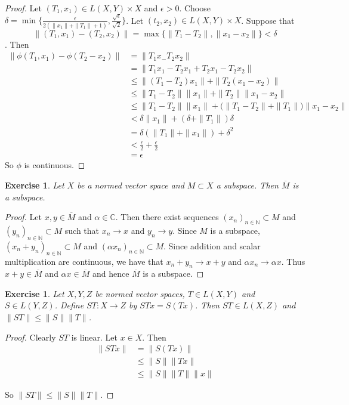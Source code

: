 \documentclass[12pt]{amsart}
\newtheorem{ex}[thm]{Exercise}
\newcommand{\al}{\alpha}
\newcommand{\del}{\delta}
\newcommand{\ep}{\epsilon}
\newcommand{\C}{\mathbb{C}}
\newcommand{\N}{\mathbb{N}}
\newcommand{\conv}[1]{\xrightarrow{#1}}
\begin{document}
	\begin{proof}
		Let $(T_1, x_1) \in L(X,Y) \times X$ and $\ep > 0$. Choose $\del = \min \{\frac{\ep}{2(\|x_1 \|+ \|T_1 \|+1)}, \frac{\sqrt{\ep}}{\sqrt{2}} \}$. Let $(t_2, x_2) \in L(X,Y) \times X$. Suppose that $$\|(T_1, x_1) - (T_2, x_2) \|= \max \{\|T_1 - T_2\|, \|x_1 -x_2 \|\} < \del$$. Then 
		\begin{align*}
			\|\phi(T_1, x_1) - \phi(T_2-x_2) \|
			&= \|T_1 x_ - T_2 x_2 \|\\
			&= \|T_1 x_1 - T_2 x_1 + T_2 x_1 - T_2 x_2 \|\\
			& \leq \|(T_1 - T_2) x_1 \|+ \|T_2(x_1 -x_2) \|\\
			& \leq \|T_1 -T_2 \|\|x_1 \|+ \|T_2 \|\|x_1 -x_2 \|\\
			& \leq \|T_1 -T_2 \|\|x_1 \|+ \big(\|T_1 - T_2 \|+ \|T_1 \|\big)\|x_1 -x_2 \|\\
			& < \del \|x_1 \|+ (\del + \|T_1 \|) \del \\
			&= \del (\|T_1 \|+ \|x_1 \|) + \del^2\\
			& < \frac{\ep}{2} + \frac{\ep}{2}\\
			&= \ep
		\end{align*}
		So $\phi$ is continuous.
	\end{proof}
	
	\begin{ex}
		Let $X$ be a normed vector space and $M \subset X$ a subspace. Then $\overline{M}$ is a subspace.
	\end{ex}
	
	\begin{proof}
		Let $x,y \in \overline{M}$ and $\al \in \C$. Then there exist sequences $(x_n)_{n \in \N} \subset M$ and $(y_n)_{n \in \N} \subset M$ such that $x_n \conv{} x$ and $y_n \conv{} y$. Since $M$ is a subspace, $(x_n +y_n)_{n \in \N} \subset M$ and $(\al x_n)_{n \in \N} \subset M$. Since addition and scalar multiplication are continuous, we have that $x_n + y_n \conv{} x+y$ and $\al x_n \conv{} \al x$. Thus $x+y \in \overline{M}$ and $\al x \in \overline{M}$ and hence $\overline{M}$ is a subspace.
	\end{proof}
	
	\begin{ex}
		Let $X,Y,Z$ be normed vector spaces, $T \in L(X,Y)$ and $S \in L(Y,Z)$. Define $ST:X \rightarrow Z$ by $STx = S(Tx)$. Then $ST \in L(X,Z)$ and $\|ST \|\leq \|S \|\|T \|$. 
	\end{ex}
	
	\begin{proof}
		Clearly $ST$ is linear. Let $x \in X$. Then 
		\begin{align*}
			\|ST x \|
			& = \|S(Tx) \|\\
			& \leq \|S \|\|Tx \|\\
			& \leq \|S \|\|T \|\|x \|
		\end{align*}
		
		So $\|ST \|\leq \|S \|\|T \|$.
	\end{proof}
	
\end{document}
